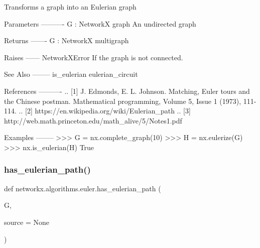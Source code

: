 \begin{DoxyVerb}Transforms a graph into an Eulerian graph

Parameters
----------
G : NetworkX graph
   An undirected graph

Returns
-------
G : NetworkX multigraph

Raises
------
NetworkXError
   If the graph is not connected.

See Also
--------
is_eulerian
eulerian_circuit

References
----------
.. [1] J. Edmonds, E. L. Johnson.
   Matching, Euler tours and the Chinese postman.
   Mathematical programming, Volume 5, Issue 1 (1973), 111-114.
.. [2] https://en.wikipedia.org/wiki/Eulerian_path
.. [3] http://web.math.princeton.edu/math_alive/5/Notes1.pdf

Examples
--------
    >>> G = nx.complete_graph(10)
    >>> H = nx.eulerize(G)
    >>> nx.is_eulerian(H)
    True\end{DoxyVerb}
 \mbox{\label{namespacenetworkx_1_1algorithms_1_1euler_a107eb2b6010025225995c8fa6cb75431}} 
\subsubsection{\texorpdfstring{has\+\_\+eulerian\+\_\+path()}{has\_eulerian\_path()}}
{\footnotesize\ttfamily def networkx.\+algorithms.\+euler.\+has\+\_\+eulerian\+\_\+path (\begin{DoxyParamCaption}\item[{}]{G,  }\item[{}]{source = {\ttfamily None} }\end{DoxyParamCaption})}

